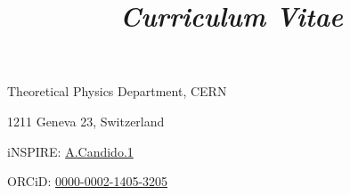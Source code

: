 \documentclass[10pt, a4paper, sans]{moderncv}
\title{\emph{Curriculum Vitae}}
\begin{document}
\makecvtitle

\vspace*{-15pt}
\begin{center}
    \color{gray}
    Theoretical Physics Department, CERN

    1211 Geneva 23, Switzerland
    \vspace{5pt}

    \emailsymbol {}
    \qquad
    \emailsymbol {}
    \qquad
    iNSPIRE: \href{https://inspirehep.net/authors/1802044}{A.Candido.1}
    
    ORCiD: \href{https://orcid.org/0000-0002-1405-3205}{0000-0002-1405-3205}
\end{center}
\bigskip







% 


% 
% 


\nocite{*}



\clearpage
\end{document}

